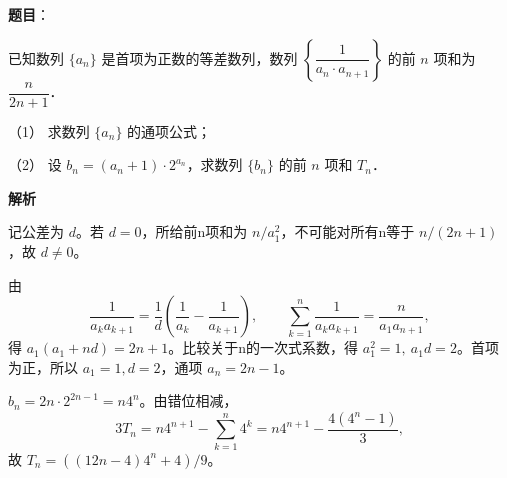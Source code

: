 \begin{answer}

\textbf{题目}：

已知数列 \(\{a_n\}\) 是首项为正数的等差数列，数列 \(\left\{\dfrac1{a_n\cdot a_{n+1}}\right\}\) 的前 \(n\) 项和为 \(\dfrac{n}{2n+1}\)．

（1） 求数列 \(\{a_n\}\) 的通项公式；

（2） 设 \(b_n=(a_n+1)\cdot2^{a_n}\)，求数列 \(\{b_n\}\) 的前 \(n\) 项和 \(T_n\)．

\textbf{解析}


记公差为 \(d\)。若 \(d=0\)，所给前n项和为 \(n/a_1^2\)，不可能对所有n等于 \(n/(2n+1)\)，故 \(d\ne0\)。

由
\nopagebreak[4]
\[
\frac1{a_ka_{k+1}}=\frac1d\left(\frac1{a_k}-\frac1{a_{k+1}}\right),
\qquad
\sum_{k=1}^n\frac1{a_ka_{k+1}}=\frac{n}{a_1a_{n+1}},
\]
得 \(a_1(a_1+nd)=2n+1\)。比较关于n的一次式系数，得 \(a_1^2=1,\ a_1d=2\)。首项为正，所以 \(a_1=1,d=2\)，通项 \(a_n=2n-1\)。


\(b_n=2n\cdot2^{2n-1}=n4^n\)。由错位相减，
\nopagebreak[4]
\[
3T_n=n4^{n+1}-\sum_{k=1}^n4^k
=n4^{n+1}-\frac{4(4^n-1)}3,
\]
故 \(T_n=((12n-4)4^n+4)/9\)。



\end{answer}
